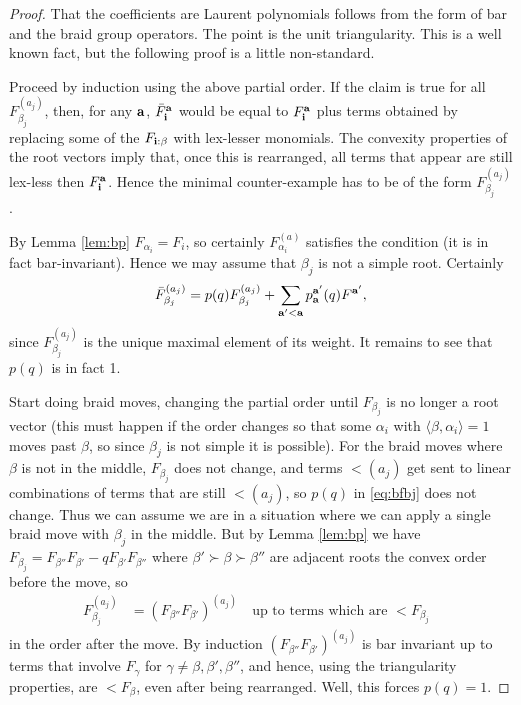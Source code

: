 \documentclass[11pt]{amsart}
\numberwithin{equation}{section}
\theoremstyle{definition}
\begin{document}
\begin{proof}
That the coefficients are Laurent polynomials follows from the form of bar and the braid group operators. The point is the unit triangularity. This is a well known fact, but the following proof is a little non-standard. 

Proceed by induction using the above partial order. If the claim is true for all $F^{(a_j)}_{\beta_j}$, then, for any ${\bf a}$, $\bar F^{\bf a}_{\bf i}$ would be equal to $F_{\bf i}^{\bf a}$ plus terms obtained by replacing some of the $F_{{\bf i}:\beta}$ with lex-lesser monomials. The convexity properties of the root vectors imply that, once this is rearranged, all terms that appear are still lex-less then $F_{\bf i}^{\bf a}$. Hence the minimal counter-example has to be of the form $F_{\beta_j}^{(a_j)}$. 

By Lemma \ref{lem:bp} $F_{\alpha_i}= F_i$, so certainly $F_{\alpha_i}^{(a)}$ satisfies the condition (it is in fact bar-invariant). Hence we may assume that $\beta_j$ is not a simple root. 
Certainly 
\begin{equation} \label{eq:bfbj}
\bar F_{\beta_j}^{(a_j)} = p(q) F_{\beta_j}^{(a_j)} + \sum_{{\bf a'}< {\bf a}} p^{\bf a'}_{{\bf a}}(q) F^{{\bf a'}},
\end{equation}
since $F_{\beta_j}^{(a_j)}$ is the unique maximal element of its weight. %
It remains to see that $p(q)$ is in fact 1. 

Start doing braid moves, changing the partial order until $F_{\beta_j}$ is no longer a root vector (this must happen if the order changes so that some $\alpha_i$ with $\langle \beta, \alpha_i \rangle=1$ moves past $\beta$, so since $\beta_j$ is not simple it is possible). 
For the braid moves where $\beta$ is not in the middle, $F_{\beta_j}$ does not change, and terms $< (a_j)$ get sent to linear combinations of terms that are still $<(a_j)$, so $p(q)$ in \eqref{eq:bfbj} does not change. Thus we can assume we are in a situation where we can apply a single braid move with $\beta_j$ in the middle. 
But by Lemma \ref{lem:bp} we have
$F_{\beta_j}= F_{\beta''} F_{\beta'} - q F_{\beta'} F_{\beta ''}$ 
where $\beta' \succ \beta \succ \beta''$ are adjacent roots the convex order before the move, so
$$
\begin{aligned}
F_{\beta_j}^{(a_j)} & = (F_{\beta''} F_{\beta'})^{(a_j)}  \quad \text{up to terms which are  $< F_{\beta_j}$ } 
\end{aligned}
$$
in the order after the move. 
By induction $ (F_{\beta''} F_{\beta'})^{(a_j)}$ is bar invariant up to terms that involve $F_\gamma$ for $\gamma \neq \beta, \beta',\beta''$, and hence, using the triangularity properties, are $< F_{\beta}$, even after being rearranged.
Well, this forces $p(q) =1$. 
\end{proof}
\end{document}
